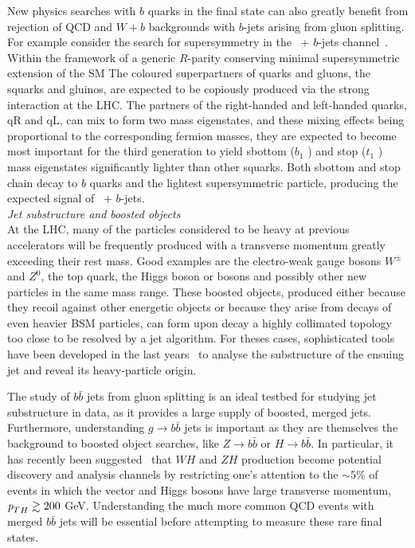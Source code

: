 New physics searches with $b$ quarks in the final state can also greatly benefit from rejection of QCD and $W+b$ backgrounds with $b$-jets arising from gluon splitting. For example consider the search for supersymmetry in the \met\ + $b$-jets channel~\cite{ATLAS-CONF-2011-098}. Within the framework of a generic $R$-parity conserving minimal supersymmetric extension of the SM The coloured superpartners of quarks and gluons, the squarks and gluinos, are expected to be copiously produced via the strong interaction at the LHC. The
partners of the right-handed and left-handed quarks, qR and qL, can mix to form two mass eigenstates, and these mixing effects being proportional to the corresponding fermion masses, they are expected to become most important for the third generation to yield sbottom ($b_1$ ) and stop ($t_1$ ) mass eigenstates significantly lighter than other squarks. Both sbottom and stop chain decay to $b$ quarks and the lightest supersymmetric particle, producing the expected signal of \met\ + $b$-jets. 
%
%
\\[5mm]
{\em Jet substructure and boosted objects}
\\[5mm]
At the LHC, many of the particles considered to be heavy at previous accelerators will be frequently produced with a transverse momentum greatly exceeding their rest mass. Good examples are the electro-weak gauge bosons $W^\pm$ and $Z^0$, the top quark, the Higgs boson or bosons and possibly other new particles in the same mass range. These boosted objects, produced either because they recoil against other energetic objects or because they arise from decays of even heavier BSM particles, can form upon decay a highly collimated topology too close to be resolved by a jet algorithm. For theses cases, sophisticated tools have been developed in the last years~\cite{boost2010,boost2010b} to analyse the substructure of the ensuing jet and reveal its heavy-particle origin. 

The study of $b\bar{b}$ jets from gluon splitting is an ideal testbed for studying jet substructure in data, as it provides a large supply of boosted, merged jets. Furthermore, understanding $g\rightarrow b \bar{b}$ jets is important as they are themselves the background to boosted object searches, like $Z\rightarrow b\bar{b}$ or $H\rightarrow b \bar{b}$.  In particular, it has recently been suggested~\cite{Butterworth:2008iy} that $WH$ and $ZH$ production become potential discovery and analysis channels by restricting one’s attention to the $\sim5$\% of events in which the vector and Higgs bosons have large transverse momentum, ${{\emph{p}_{T}}}_H\gtrsim200$ GeV. Understanding the much more common QCD events with merged $b\bar{b}$ jets will be essential before attempting to measure these rare final states.



